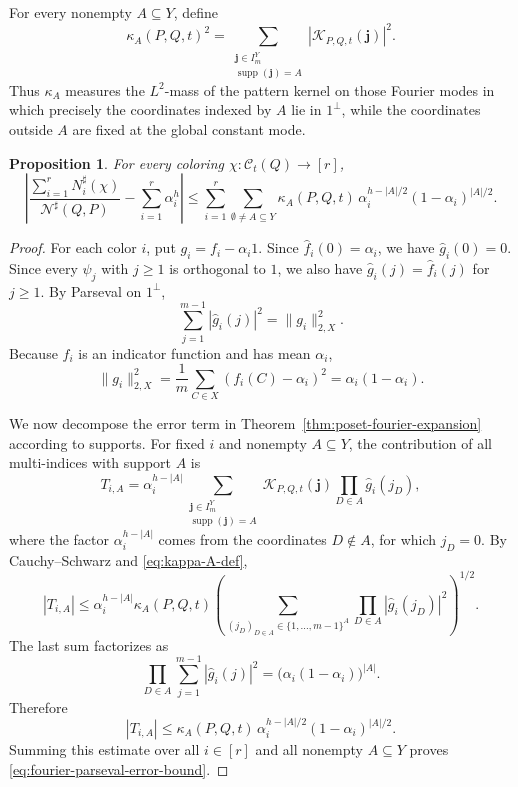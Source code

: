 \documentclass[twoside,12pt]{article}
\newtheorem{proposition}{Proposition}[section]
\begin{document}
For every nonempty \(A\subseteq Y\), define
\begin{equation}\label{eq:kappa-A-def}
 \kappa_A(P,Q,t)^2
 =
 \sum_{\substack{\mathbf j\in I_m^Y\\ \operatorname{supp}(\mathbf j)=A}}
 |\mathcal K_{P,Q,t}(\mathbf j)|^2.
\end{equation}
Thus \(\kappa_A\) measures the \(L^2\)-mass of the pattern kernel on those
Fourier modes in which precisely the coordinates indexed by \(A\) lie in
\(1^\perp\), while the coordinates outside \(A\) are fixed at the global
constant mode.

\begin{proposition}
\label{prop:poset-fourier-parseval-bound}
For every coloring \(\chi:\mathcal C_t(Q)\to[r]\),
\begin{equation}\label{eq:fourier-parseval-error-bound}
 \left|
 \frac{\sum_{i=1}^rN_i^\sharp(\chi)}{\mathcal N^\sharp(Q,P)}
 -
 \sum_{i=1}^r\alpha_i^h
 \right|
 \le
 \sum_{i=1}^r
 \sum_{\emptyset\ne A\subseteq Y}
 \kappa_A(P,Q,t)\,
 \alpha_i^{h-|A|/2}(1-\alpha_i)^{|A|/2}.
\end{equation}
\end{proposition}

\begin{proof}
For each color \(i\), put \(g_i=f_i-\alpha_i1\). Since
\(\widehat f_i(0)=\alpha_i\), we have \(\widehat g_i(0)=0\). Since every
\(\psi_j\) with \(j\ge1\) is orthogonal to \(1\), we also have
\(\widehat g_i(j)=\widehat f_i(j)\) for \(j\ge1\). By Parseval on
\(1^\perp\),
\[
 \sum_{j=1}^{m-1}|\widehat g_i(j)|^2
 =
 \|g_i\|_{2,X}^2.
\]
Because \(f_i\) is an indicator function and has mean \(\alpha_i\),
\[
 \|g_i\|_{2,X}^2
 =
 \frac1m\sum_{C\in X}(f_i(C)-\alpha_i)^2
 =
 \alpha_i(1-\alpha_i).
\]

We now decompose the error term in Theorem~\ref{thm:poset-fourier-expansion}
according to supports. For fixed \(i\) and nonempty \(A\subseteq Y\), the
contribution of all multi-indices with support \(A\) is
\[
 T_{i,A}
 =
 \alpha_i^{h-|A|}
 \sum_{\substack{\mathbf j\in I_m^Y\\ \operatorname{supp}(\mathbf j)=A}}
 \mathcal K_{P,Q,t}(\mathbf j)
 \prod_{D\in A}\widehat g_i(j_D),
\]
where the factor \(\alpha_i^{h-|A|}\) comes from the coordinates
\(D\notin A\), for which \(j_D=0\). By Cauchy--Schwarz and
\eqref{eq:kappa-A-def},
\[
 |T_{i,A}|
 \le
 \alpha_i^{h-|A|}\kappa_A(P,Q,t)
 \left(
 \sum_{(j_D)_{D\in A}\in\{1,\ldots,m-1\}^A}
 \prod_{D\in A}|\widehat g_i(j_D)|^2
 \right)^{1/2}.
\]
The last sum factorizes as
\[
 \prod_{D\in A}\sum_{j=1}^{m-1}|\widehat g_i(j)|^2
 =
 \bigl(\alpha_i(1-\alpha_i)\bigr)^{|A|}.
\]
Therefore
\[
 |T_{i,A}|
 \le
 \kappa_A(P,Q,t)\,
 \alpha_i^{h-|A|/2}(1-\alpha_i)^{|A|/2}.
\]
Summing this estimate over all \(i\in[r]\) and all nonempty \(A\subseteq Y\)
proves \eqref{eq:fourier-parseval-error-bound}.
\end{proof}
\end{document}

